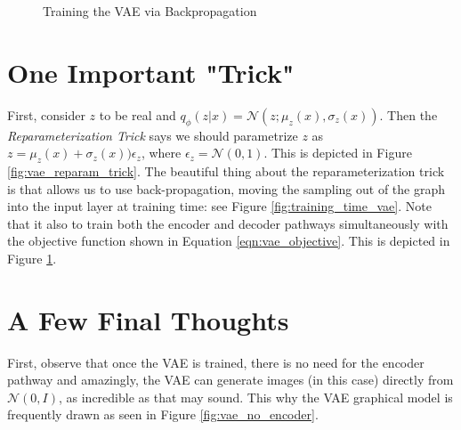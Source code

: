 \documentclass[11pt, oneside]{article}   	%
\begin{document}
\begin{figure}
\caption{Training the VAE via Backpropagation}
\label{fig:vae_training}
\end{figure}

\section{One Important "Trick"}

First, consider $z$ to be real and $q_{\phi}(z|x) = \mathcal{N}(z; \mu_{z}(x), \sigma_{z}(x))$. Then the \emph{Reparameterization Trick} says we should parametrize $z$ as 
$z = \mu_{z}(x) + \sigma_{z}(x))\epsilon_{z}$, where $\epsilon_{z} = \mathcal{N}(0,1)$. This is depicted in Figure \ref{fig:vae_reparam_trick}. The beautiful thing about the reparameterization trick is that allows us to use back-propagation, moving the sampling out of the graph into the input layer at training time: see Figure \ref{fig:training_time_vae}. Note that it also to train both the encoder and decoder pathways simultaneously with the objective function shown in Equation \ref{eqn:vae_objective}. This is depicted in Figure \ref{fig:vae_training}.

\section{A Few Final Thoughts}

First, observe that once the VAE is trained, there is no need for the encoder pathway and amazingly, the VAE can generate images (in this case) directly from $\mathcal{N}(0,I)$, as incredible as that may sound. This why the VAE graphical model is frequently drawn as seen in Figure \ref{fig:vae_no_encoder}.
\end{document}
